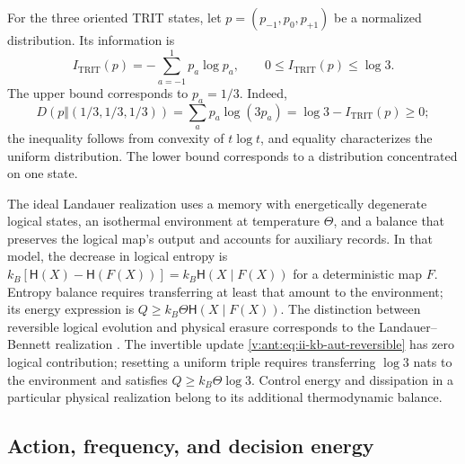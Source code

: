 For the three oriented TRIT states, let
\(p=(p_{-1},p_0,p_{+1})\) be a normalized distribution. Its information is
\begin{equation}
 I_{\mathrm{TRIT}}(p)=-\sum_{a=-1}^{1}p_a\log p_a,
 \qquad 0\leq I_{\mathrm{TRIT}}(p)\leq\log3.
 \label{v:ant:eq:ii-kb-aut-trit}
\end{equation}
The upper bound corresponds to \(p_a=1/3\). Indeed,
\[
 D(p\Vert(1/3,1/3,1/3))
 =\sum_ap_a\log(3p_a)=\log3-I_{\mathrm{TRIT}}(p)\geq0;
\]
the inequality follows from convexity of \(t\log t\), and
equality characterizes the uniform distribution. The lower bound
corresponds to a distribution concentrated on one state.

The ideal Landauer realization uses a memory with energetically
degenerate logical states, an isothermal environment at temperature \(\Theta\),
and a balance that preserves the logical map's output and accounts for
auxiliary records. In that model, the decrease in logical entropy is
\(k_B[\mathsf H(X)-\mathsf H(F(X))]
=k_B\mathsf H(X\mid F(X))\) for a deterministic map \(F\).
Entropy balance requires transferring at least that amount to the environment;
its energy expression is \(Q\geq k_B\Theta\mathsf H(X\mid F(X))\).
The distinction between reversible logical evolution and physical erasure
corresponds to the Landauer--Bennett realization \cite{bennett2003}.
The invertible update
\eqref{v:ant:eq:ii-kb-aut-reversible} has zero logical contribution; resetting
a uniform triple requires transferring \(\log3\) nats
to the environment and satisfies \(Q\geq k_B\Theta\log3\).
Control energy and dissipation in a particular physical
realization belong to its additional thermodynamic balance.

\subsection{Action, frequency, and decision energy}

